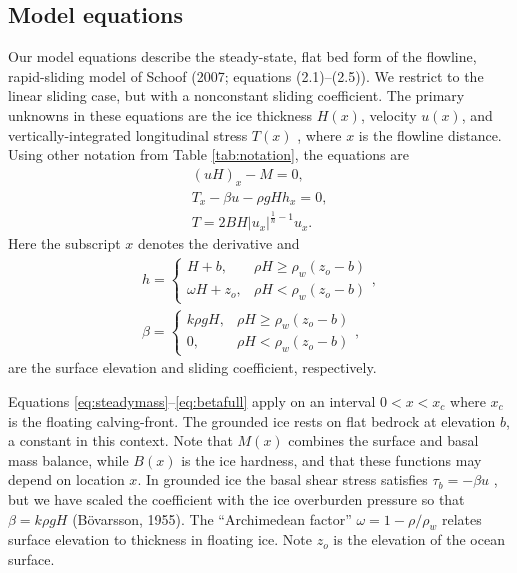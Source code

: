 \documentclass[review,letterpaper]{igs}
\renewcommand{\dh}{\fontencoding{T1}\selectfont{\symbol{240}}}
\newcommand{\citepbod}{(B\"o\dh varsson, 1955)\nocite{Bodvardsson}}
\begin{document}
\subsection*{Model equations}  Our model equations describe the steady-state, flat bed form of the flowline, rapid-sliding model of Schoof\nocite{SchoofMarine1} (2007; equations (2.1)--(2.5)).  We restrict to the linear sliding case, but with a nonconstant sliding coefficient.  The primary unknowns in these equations are the ice thickness $H(x)$, velocity $u(x)$, and vertically-integrated longitudinal stress $T(x)$ \citep{SchoofStream}, where $x$ is the flowline distance.  Using other notation from Table \ref{tab:notation}, the equations are
\begin{gather}
(uH)_x - M = 0, \label{eq:steadymass} \\
T_x - \beta u - \rho g H h_x = 0, \label{eq:steadySSA} \\
T = 2 B H |u_x|^{\frac{1}{n}-1} u_x. \label{eq:Tstress}
\end{gather}
Here the subscript $x$ denotes the derivative and
\begin{gather}
h = \begin{cases} H+b,            & \rho H \ge \rho_w (z_o - b) \\
                  \omega H + z_o, & \rho H < \rho_w (z_o - b) \end{cases}, \label{eq:surface} \\
\beta = \begin{cases} k \rho g H,    & \rho H \ge \rho_w (z_o - b) \\
                      0,          & \rho H < \rho_w (z_o - b) \end{cases}, \label{eq:betafull}
\end{gather}
are the surface elevation and sliding coefficient, respectively.

Equations \eqref{eq:steadymass}--\eqref{eq:betafull} apply on an interval $0 < x < x_c$ where $x_c$ is the floating calving-front.  The grounded ice rests on flat bedrock at elevation $b$, a constant in this context.  Note that $M(x)$ combines the surface and basal mass balance, while $B(x)$ is the ice hardness, and that these functions may depend on location $x$.  In grounded ice the basal shear stress satisfies $\tau_b = - \beta u$ \citep{MacAyeal}, but we have scaled the coefficient with the ice overburden pressure so that $\beta = k \rho g H$ \citepbod.  The ``Archimedean factor'' $\omega = 1 - \rho/\rho_w$ relates surface elevation to thickness in floating ice.  Note $z_o$ is the elevation of the ocean surface.
\end{document}
